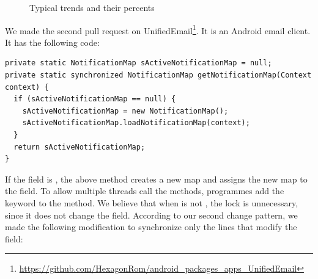 \begin{figure}
	
	\caption{Typical trends and their percents}
	\label{figure:trend}\vspace*{-3ex}
\end{figure}
We made the second pull request on UnifiedEmail\footnote{\url{https://github.com/HexagonRom/android_packages_apps_UnifiedEmail}}. It is an Android email client. It has the following code:

\begin{lstlisting}
private static NotificationMap sActiveNotificationMap = null;
private static synchronized NotificationMap getNotificationMap(Context context) {
  if (sActiveNotificationMap == null) {
    sActiveNotificationMap = new NotificationMap();
    sActiveNotificationMap.loadNotificationMap(context);
  }
  return sActiveNotificationMap;
}
\end{lstlisting}

If the  field is , the above method creates a new map and assigns the new map to the field. To allow multiple threads call the methods, programmes add the  keyword to the method. We believe that when  is not , the lock is unnecessary, since it does not change the field. According to our second change pattern, we made the following modification to synchronize only the lines that modify the field:

